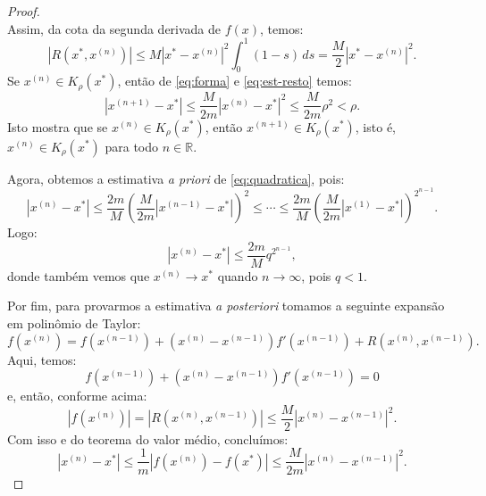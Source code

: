 \begin{ex}
\begin{proof}
\begin{equation}
\end{equation}
Assim, da cota da segunda derivada de $f(x)$, temos:
\begin{equation}\label{eq:est-resto}
  |R(x^*,x^{(n)})| \leq M|x^*-x^{(n)}|^2\int_0^1 (1-s)\,ds = \frac{M}{2}|x^* - x^{(n)}|^2.
\end{equation}\label{eq:quadratica}
Se $x^{(n)}\in K_\rho(x^*)$, então de \eqref{eq:forma} e \eqref{eq:est-resto} temos:
\begin{equation}
  |x^{(n+1)} - x^*| \leq \frac{M}{2m}|x^{(n)} - x^*|^2 \leq \frac{M}{2m}\rho^2 < \rho.
\end{equation}
Isto mostra que se $x^{(n)}\in K_\rho(x^*)$, então $x^{(n+1)}\in K_\rho(x^*)$, isto é, $x^{(n)}\in K_\rho(x^*)$ para todo $n\in\mathbb{R}$.

Agora, obtemos a estimativa \emph{a priori} de \eqref{eq:quadratica}, pois:
\begin{equation}
  |x^{(n)} - x^*| \leq \frac{2m}{M}\left(\frac{M}{2m}|x^{(n-1)}-x^*|\right)^2 \leq \cdots \leq \frac{2m}{M}\left(\frac{M}{2m} |x^{(1)}-x^*|\right)^{2^{n-1}}.
\end{equation}
Logo:
\begin{equation}
  |x^{(n)} - x^*| \leq \frac{2m}{M}q^{2^{n-1}},
\end{equation}
donde também vemos que $x^{(n)}\to x^*$ quando $n\to\infty$, pois $q < 1$.

Por fim, para provarmos a estimativa \emph{a posteriori} tomamos a seguinte expansão em polinômio de Taylor:
\begin{equation}
  f(x^{(n)}) = f(x^{(n-1)}) + (x^{(n)} - x^{(n-1)})f'(x^{(n-1)}) + R(x^{(n)},x^{(n-1)}).
\end{equation}
Aqui, temos:
\begin{equation}
  f(x^{(n-1)}) + (x^{(n)} - x^{(n-1)})f'(x^{(n-1)}) = 0
\end{equation}
e, então, conforme acima:
\begin{equation}
  |f(x^{(n)})| = |R(x^{(n)},x^{(n-1)})| \leq \frac{M}{2}|x^{(n)} - x^{(n-1)}|^2.
\end{equation}
Com isso e do teorema do valor médio, concluímos:
\begin{equation}
  |x^{(n)} - x^*| \leq \frac{1}{m}|f(x^{(n)}) - f(x^*)| \leq \frac{M}{2m}|x^{(n)} - x^{(n-1)}|^2.
\end{equation}
\end{proof}


\end{ex}
